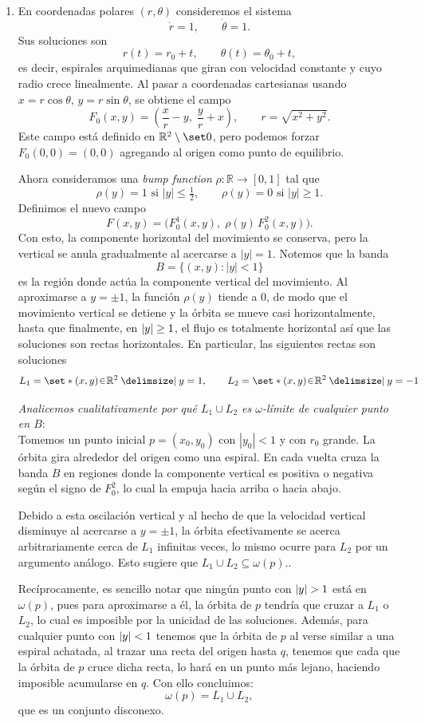 \begin{sol}
\begin{enumerate}[label=\textbf{(\alph*)}]
\item{}
En coordenadas polares $(r,\theta)$ consideremos el sistema
\[
\dot r = 1, \qquad \dot\theta = 1.
\]
Sus soluciones son
\[
r(t)=r_0+t,\qquad \theta(t)=\theta_0+t,
\]
es decir, espirales arquimedianas que giran con velocidad constante y cuyo radio crece linealmente. Al pasar a coordenadas cartesianas usando $x=r\cos\theta$, $y=r\sin\theta$, se obtiene el campo
\[
F_0(x,y) = \left( \frac{x}{r} - y ,\; \frac{y}{r} + x \right), \qquad r=\sqrt{x^2+y^2}.
\]
Este campo está definido en $\mathbb{R}^2\setminus\set0$, pero podemos forzar $F_0(0,0)=(0,0)$ agregando al origen como punto de equilibrio.


Ahora consideramos una \emph{bump function} $\rho:\mathbb{R}\to[0,1]$ tal que
\[
\rho(y)=1 \text{ si } |y|\le \tfrac12, \qquad \rho(y)=0 \text{ si } |y|\ge 1.
\]
Definimos el nuevo campo
\[
F(x,y)=\big(F_0^1(x,y),\; \rho(y)\,F_0^2(x,y)\big).
\]
Con esto, la componente horizontal del movimiento se conserva, pero la vertical se anula gradualmente al acercarse a $|y|=1$. Notemos que la banda
\[
B=\{(x,y):|y|<1\}
\]
es la región donde actúa la componente vertical del movimiento. Al aproximarse a $y=\pm1$, la función $\rho(y)$ tiende a $0$, de modo que el movimiento vertical se detiene y la órbita se mueve casi horizontalmente, hasta que finalmente, en $\abs{y} \geq 1$, el flujo es totalmente horizontal así que las soluciones son rectas horizontales. En particular, las siguientes rectas son soluciones
\[
L_1=\set*{(x,y)\en\mathbb{R}^2 \given y=1},\qquad L_2=\set*{(x,y)\en\mathbb{R}^2 \given y=-1}
\]


\emph{Analicemos cualitativamente por qué $L_1 \cup L_2$ es $\omega$-límite de cualquier punto en $B$}:\\
Tomemos un punto inicial $p=(x_0,y_0)$ con $|y_0|<1$ y con $r_0$ grande.  
La órbita gira alrededor del origen como una espiral. En cada vuelta cruza la banda $B$ en regiones donde la componente vertical es positiva o negativa según el signo de $F_0^2$, lo cual la empuja hacia arriba o hacia abajo.

Debido a esta oscilación vertical y al hecho de que la velocidad vertical disminuye al acercarse a $y=\pm 1$, la órbita efectivamente se acerca arbitrariamente cerca de $L_1$ infinitas veces, lo mismo ocurre para $L_2$ por un argumento análogo. Esto sugiere que $L_1\cup L_2 \subseteq \omega(p).$.

Recíprocamente, es sencillo notar que ningún punto con $\abs{y} > 1$ está en $\omega(p)$, pues para aproximarse a él, la órbita de $p$ tendría que cruzar a $L_1$ o $L_2$, lo cual es imposible por la unicidad de las soluciones. Además, para cualquier punto con $\abs{y} < 1$ tenemos que la órbita de $p$ al verse similar a una espiral achatada, al trazar una recta del origen hasta $q$, tenemos que cada que la órbita de $p$ cruce dicha recta, lo hará en un punto más lejano, haciendo imposible acumularse en $q$. Con ello concluimos:
\[
\omega(p)=L_1\cup L_2,
\]
que es un conjunto disconexo.


\end{enumerate}
\end{sol}

